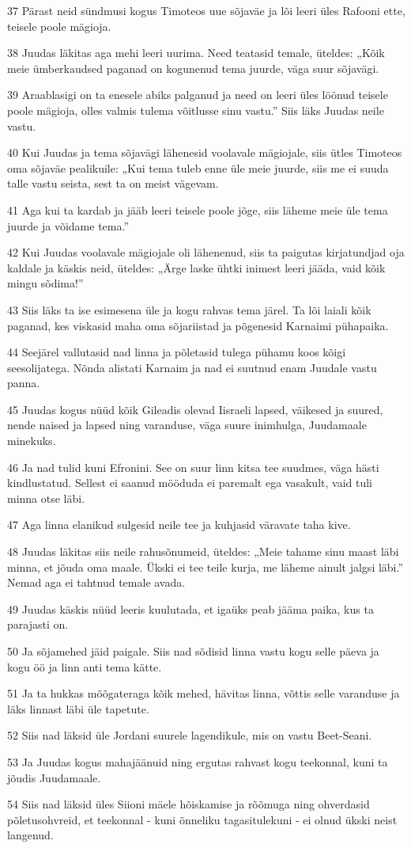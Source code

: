 \par 37 Pärast neid sündmusi kogus Timoteos uue sõjaväe ja lõi leeri üles Rafooni ette, teisele poole mägioja.
\par 38 Juudas läkitas aga mehi leeri uurima. Need teatasid temale, üteldes: „Kõik meie ümberkaudsed paganad on kogunenud tema juurde, väga suur sõjavägi.
\par 39 Araablasigi on ta enesele abiks palganud ja need on leeri üles löönud teisele poole mägioja, olles valmis tulema võitlusse sinu vastu.” Siis läks Juudas neile vastu.
\par 40 Kui Juudas ja tema sõjavägi lähenesid voolavale mägiojale, siis ütles Timoteos oma sõjaväe pealikuile: „Kui tema tuleb enne üle meie juurde, siis me ei suuda talle vastu seista, sest ta on meist vägevam.
\par 41 Aga kui ta kardab ja jääb leeri teisele poole jõge, siis läheme meie üle tema juurde ja võidame tema.”
\par 42 Kui Juudas voolavale mägiojale oli lähenenud, siis ta paigutas kirjatundjad oja kaldale ja käskis neid, üteldes: „Ärge laske ühtki inimest leeri jääda, vaid kõik mingu sõdima!”
\par 43 Siis läks ta ise esimesena üle ja kogu rahvas tema järel. Ta lõi laiali kõik paganad, kes viskasid maha oma sõjariistad ja põgenesid Karnaimi pühapaika.
\par 44 Seejärel vallutasid nad linna ja põletasid tulega pühamu koos kõigi seesolijatega. Nõnda alistati Karnaim ja nad ei suutnud enam Juudale vastu panna.
\par 45 Juudas kogus nüüd kõik Gileadis olevad Iisraeli lapsed, väikesed ja suured, nende naised ja lapsed ning varanduse, väga suure inimhulga, Juudamaale minekuks.
\par 46 Ja nad tulid kuni Efronini. See on suur linn kitsa tee suudmes, väga hästi kindlustatud. Sellest ei saanud mööduda ei paremalt ega vasakult, vaid tuli minna otse läbi.
\par 47 Aga linna elanikud sulgesid neile tee ja kuhjasid väravate taha kive.
\par 48 Juudas läkitas siis neile rahusõnumeid, üteldes: „Meie tahame sinu maast läbi minna, et jõuda oma maale. Ükski ei tee teile kurja, me läheme ainult jalgsi läbi.” Nemad aga ei tahtnud temale avada.
\par 49 Juudas käskis nüüd leeris kuulutada, et igaüks peab jääma paika, kus ta parajasti on.
\par 50 Ja sõjamehed jäid paigale. Siis nad sõdisid linna vastu kogu selle päeva ja kogu öö ja linn anti tema kätte.
\par 51 Ja ta hukkas mõõgateraga kõik mehed, hävitas linna, võttis selle varanduse ja läks linnast läbi üle tapetute.
\par 52 Siis nad läksid üle Jordani suurele lagendikule, mis on vastu Beet-Seani.
\par 53 Ja Juudas kogus mahajäänuid ning ergutas rahvast kogu teekonnal, kuni ta jõudis Juudamaale.
\par 54 Siis nad läksid üles Siioni mäele hõiskamise ja rõõmuga ning ohverdasid põletusohvreid, et teekonnal - kuni õnneliku tagasitulekuni - ei olnud ükski neist langenud. 

